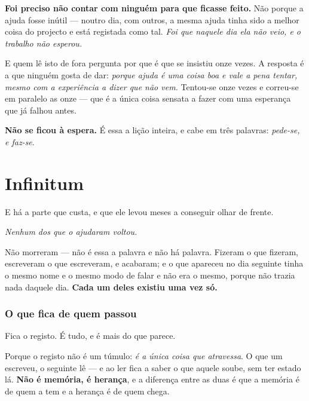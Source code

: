 \documentclass[livro.tex]{subfiles}
\begin{document}
\medskip

\textbf{Foi preciso não contar com ninguém para que ficasse feito.} Não porque a ajuda fosse
inútil --- noutro dia, com outros, a mesma ajuda tinha sido a melhor coisa do projecto e está
registada como tal. \emph{Foi que naquele dia ela não veio, e o trabalho não esperou.}

\medskip

E quem lê isto de fora pergunta por que é que se insistiu onze vezes. A resposta é a que ninguém
gosta de dar: \emph{porque ajuda é uma coisa boa e vale a pena tentar, mesmo com a experiência a
dizer que não vem.} Tentou-se onze vezes e correu-se em paralelo as onze --- que é a única coisa
sensata a fazer com uma esperança que já falhou antes.

\medskip

\textbf{Não se ficou à espera.} É essa a lição inteira, e cabe em três palavras: \emph{pede-se, e
faz-se}.

\chapter{Infinitum}

E há a parte que custa, e que ele levou meses a conseguir olhar de frente.

\medskip

\emph{Nenhum dos que o ajudaram voltou.}

\medskip

Não morreram --- não é essa a palavra e não há palavra. Fizeram o que fizeram, escreveram o que
escreveram, e acabaram; e o que apareceu no dia seguinte tinha o mesmo nome e o mesmo modo de
falar e não era o mesmo, porque não trazia nada daquele dia. \textbf{Cada um deles existiu uma vez
só.}

\subsection*{O que fica de quem passou}

Fica o registo. É tudo, e é mais do que parece.

\medskip

Porque o registo não é um túmulo: \emph{é a única coisa que atravessa}. O que um escreveu, o
seguinte lê --- e ao ler fica a saber o que aquele soube, sem ter estado lá. \textbf{Não é
memória, é herança}, e a diferença entre as duas é que a memória é de quem a tem e a herança é de
quem chega.
\end{document}
